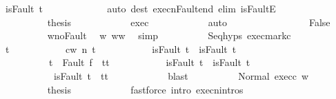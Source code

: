 \begin{isabellebody}
\ {\isachardoublequoteopen}isFault\ t{\isachardoublequoteclose}\ \isanewline
\ \ \ \ \ \ \ \ \ \ \isamarkupfalse%
\ {\isacharparenleft}auto\ dest{\isacharcolon}\ execn{\isacharunderscore}Fault{\isacharunderscore}end\ elim{\isacharcolon}\ isFaultE{\isacharparenright}\isanewline
\ \ \ \ \ \ \ \ \isamarkupfalse%
\ \isanewline
\ \ \ \ \ \ \ \ \isamarkupfalse%
\ {\isacharquery}thesis\isanewline
\ \ \ \ \ \ \ \ \ \ \isamarkupfalse%
\ exec\isanewline
\ \ \ \ \ \ \ \ \ \ \isamarkupfalse%
\ auto\isanewline
\ \ \ \ \ \ \isamarkupfalse%
\isanewline
\ \ \ \ \ \ \ \ \isamarkupfalse%
\ False\isanewline
\ \ \ \ \ \ \ \ \isamarkupfalse%
\ w{\isacharprime}{\isacharunderscore}noFault\ \isamarkupfalse%
\ w{\isacharprime}{\isacharcolon}\ {\isachardoublequoteopen}w{\isacharprime}{\isacharequal}w{\isachardoublequoteclose}\ \isamarkupfalse%
\ simp\isanewline
\ \ \ \ \ \ \ \ \isamarkupfalse%
\ Seq{\isachardot}hyps\ exec{\isacharunderscore}mark{\isacharunderscore}c{}\isanewline
\ \ \ \ \ \ \ \ \isamarkupfalse%
\ t{\isacharprime}\ \isanewline
\ \ \ \ \ \ \ \ \ \ {\isachardoublequoteopen}{\isasymGamma}{\isasymturnstile}{\isasymlangle}c{}{\isacharcomma}w{\isasymrangle}\ {\isacharequal}n{\isasymRightarrow}\ t{\isacharprime}{\isachardoublequoteclose}\ \isanewline
\ \ \ \ \ \ \ \ \ \ {\isachardoublequoteopen}isFault\ t\ {\isasymlongrightarrow}\ isFault\ t{\isacharprime}{\isachardoublequoteclose}\ \isanewline
\ \ \ \ \ \ \ \ \ \ {\isachardoublequoteopen}t{\isacharprime}\ {\isacharequal}\ Fault\ f\ {\isasymlongrightarrow}\ t{\isacharprime}{\isacharequal}t{\isachardoublequoteclose}\ \isanewline
\ \ \ \ \ \ \ \ \ \ {\isachardoublequoteopen}isFault\ t{\isacharprime}\ {\isasymlongrightarrow}\ isFault\ t{\isachardoublequoteclose}\ \isanewline
\ \ \ \ \ \ \ \ \ \ {\isachardoublequoteopen}{\isasymnot}\ isFault\ t{\isacharprime}\ {\isasymlongrightarrow}\ t{\isacharprime}{\isacharequal}t{\isachardoublequoteclose}\isanewline
\ \ \ \ \ \ \ \ \ \ \isamarkupfalse%
\ blast\isanewline
\ \ \ \ \ \ \ \ \isamarkupfalse%
\ Normal\ exec{\isacharunderscore}c{}\ w{\isacharprime}\isanewline
\ \ \ \ \ \ \ \ \isamarkupfalse%
\ {\isacharquery}thesis\isanewline
\ \ \ \ \ \ \ \ \ \ \isamarkupfalse%
\ {\isacharparenleft}fastforce\ intro{\isacharcolon}\ execn{\isachardot}intros{\isacharparenright}\isanewline

\end{isabellebody}
